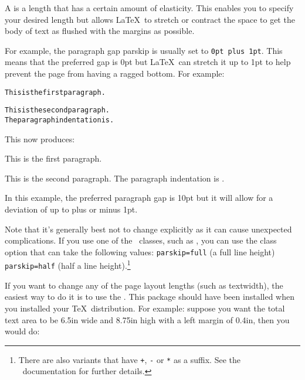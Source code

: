 A  is a length that has a certain amount of
elasticity. This enables you to specify your desired length but
allows \LaTeX\ to stretch or contract the space to get the body of
text as flushed with the margins as possible.

For example, the paragraph gap \gls{parskip} is usually set to
\texttt{0pt plus 1pt}.  This means that the preferred gap is
0pt but \LaTeX\ can stretch it up to 1pt to help prevent the
page from having a ragged bottom. For example:
\begin{code}
\begin{alltt}
\marg{0pt}

This is the first paragraph.

This is the second paragraph.
The paragraph indentation is .
\end{alltt}
\end{code}%
This now produces:
\begin{result}
\setlength{\parindent}{0pt}
\setlength{\parskip}{10pt plus 1pt minus 1pt}

This is the first paragraph.

This is the second paragraph.
The paragraph indentation is \the\parindent.
\end{result}%
In this example, the preferred paragraph gap is 10pt but
it will allow for a deviation of up to plus or minus 1pt.

\warning Note that it's generally best not to change 
explicitly as it can cause unexpected complications. If you use one
of the \koma\ classes, such as , you can use the
 class option that can take the following values:
\texttt{parskip=full} (a full line height) \texttt{parskip=half}
(half a line height).\footnote{There are also variants that have
\texttt{+}, \texttt{-} or \texttt{*} as a suffix. See the 
\koma\ documentation for further details.}

\begin{codeS}
\end{codeS}

If you want to change any of the page layout lengths (such as
\gls{textwidth}), the easiest way to do it is to use the
 .  This package should have been installed
when you installed your \TeX\ distribution. For example: suppose you want the total text
area to be 6.5in wide and 8.75in high with a left margin of 0.4in, then you would do:
\begin{codeS}
\end{codeS}
